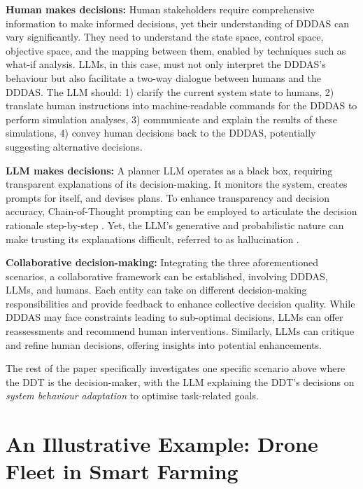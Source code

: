 \documentclass[runningheads]{llncs}
\begin{document}
\textbf{Human makes decisions:}
Human stakeholders require comprehensive information to make informed decisions, yet their understanding of DDDAS can vary significantly. They need to understand the state space, control space, objective space, and the mapping between them, enabled by techniques such as what-if analysis. 
LLMs, in this case, must not only interpret the DDDAS's behaviour but also facilitate a two-way dialogue between humans and the DDDAS. The LLM should:
1) clarify the current system state to humans, 2) translate human instructions into machine-readable commands for the DDDAS to perform simulation analyses, 3) communicate and explain the results of these simulations, 4) convey human decisions back to the DDDAS, potentially suggesting alternative decisions.
    
\textbf{LLM makes decisions:}
A planner LLM operates as a black box, requiring transparent explanations of its decision-making. It monitors the system, creates prompts for itself, and devises plans. To enhance transparency and decision accuracy, Chain-of-Thought prompting can be employed to articulate the decision rationale step-by-step \cite{NEURIPS2022_CoT}. Yet, the LLM's generative and probabilistic nature can make trusting its explanations difficult, referred to as hallucination \cite{huang_survey_2023}.

\textbf{Collaborative decision-making:}
Integrating the three aforementioned scenarios, a collaborative framework can be established, involving DDDAS, LLMs, and humans. Each entity can take on different decision-making responsibilities and provide feedback to enhance collective decision quality. While DDDAS may face constraints leading to sub-optimal decisions, LLMs can offer reassessments and recommend human interventions. Similarly, LLMs can critique and refine human decisions, offering insights into potential enhancements.


The rest of the paper specifically investigates one specific scenario above where the DDT is the decision-maker, with the LLM explaining the DDT's decisions on \textit{system behaviour adaptation} to optimise task-related goals.


\vspace{-.4cm}
\section{An Illustrative Example: Drone Fleet in Smart Farming} \label{sec:example}
\vspace{-.2cm}
\end{document}

